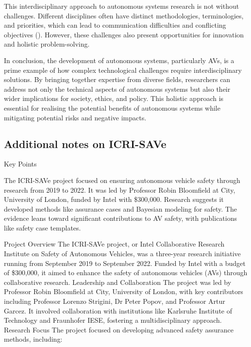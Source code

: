 This interdisciplinary approach to autonomous systems research is not without challenges. Different disciplines often have distinct methodologies, terminologies, and priorities, which can lead to communication difficulties and conflicting objectives (\cite{Stilgoe2018}). However, these challenges also present opportunities for innovation and holistic problem-solving.

In conclusion, the development of autonomous systems, particularly AVs, is a prime example of how complex technological challenges require interdisciplinary solutions. By bringing together expertise from diverse fields, researchers can address not only the technical aspects of autonomous systems but also their wider implications for society, ethics, and policy. This holistic approach is essential for realising the potential benefits of autonomous systems while mitigating potential risks and negative impacts.


\subsection{Additional notes on ICRI-SAVe}


Key Points

    The ICRI-SAVe project focused on ensuring autonomous vehicle safety through research from 2019 to 2022.
    It was led by Professor Robin Bloomfield at City, University of London, funded by Intel with \$300,000.
    Research suggests it developed methods like assurance cases and Bayesian modeling for safety.
    The evidence leans toward significant contributions to AV safety, with publications like safety case templates.

Project Overview
The ICRI-SAVe project, or Intel Collaborative Research Institute on Safety of Autonomous Vehicles, was a three-year research initiative running from September 2019 to September 2022. Funded by Intel with a budget of \$300,000, it aimed to enhance the safety of autonomous vehicles (AVs) through collaborative research.
Leadership and Collaboration
The project was led by Professor Robin Bloomfield at City, University of London, with key contributors including Professor Lorenzo Strigini, Dr Peter Popov, and Professor Artur Garcez. It involved collaboration with institutions like Karlsruhe Institute of Technology and Fraunhofer IESE, fostering a multidisciplinary approach.
Research Focus
The project focused on developing advanced safety assurance methods, including:

